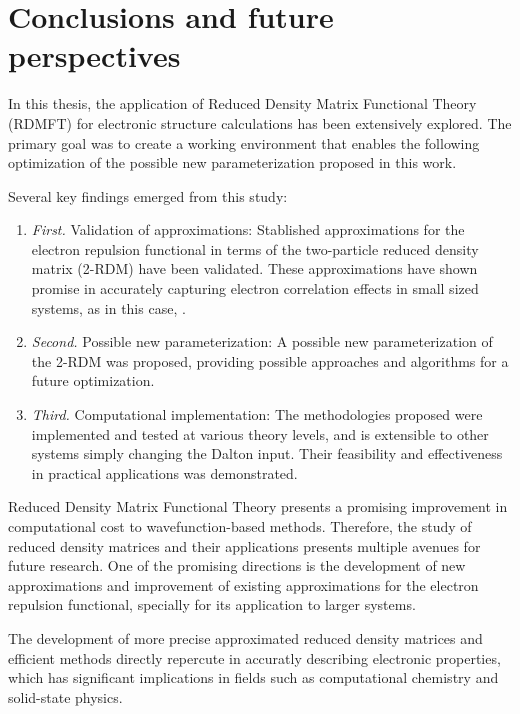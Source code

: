 \section{Conclusions and future perspectives} %
\label{sec:conclusions}
In this thesis, the application of Reduced Density Matrix Functional Theory 
(RDMFT) for electronic structure calculations has been extensively explored.
The primary goal was to create a working environment that enables the 
following optimization of the possible new parameterization proposed in this
work.

Several key findings emerged from this study:
\begin{enumerate}[label={}]
    \item \textit{First.} Validation of approximations:
        Stablished approximations for the electron repulsion functional in terms of 
        the two-particle reduced density matrix (2-RDM) have been validated.
        These approximations have shown promise in accurately capturing 
        electron correlation effects in small sized systems, as in this case,
        .
    \item \textit{Second.} Possible new parameterization:
        A possible new parameterization of the 2-RDM was proposed, providing 
        possible approaches and algorithms for a future optimization.
    \item \textit{Third.} Computational implementation:
        The methodologies proposed were implemented and tested at
        various theory levels, and is extensible to other systems
        simply changing the Dalton input.
        Their feasibility and effectiveness in practical applications was
        demonstrated.
\end{enumerate}

Reduced Density Matrix Functional Theory presents a promising improvement
in computational cost to wavefunction-based methods.
Therefore, the study of reduced density matrices and their applications
presents multiple avenues for future research.
One of the promising directions is the development of new approximations
and improvement of existing approximations for the electron repulsion functional,
specially for its application to larger systems.

The development of more precise approximated reduced 
density matrices and efficient methods directly repercute in accuratly describing
electronic properties, which has significant implications in fields such as
computational chemistry and solid-state physics. 

